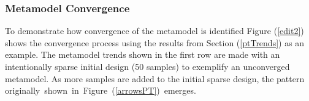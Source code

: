 {\color{blue}
\subsubsection{Metamodel Convergence\label{converge}}

%
To demonstrate how convergence of the metamodel is identified %
Figure (\ref{edit2}) shows the convergence process using the results from Section (\ref{ptTrends})
as an example. The  metamodel trends shown in the first row %
are made with an intentionally sparse initial design (50 samples) to exemplify 
an unconverged metamodel. As more samples are added to the initial sparse 
design, the pattern \mbox{originally shown in Figure (\ref{arrowsPT}) emerges.} %

}
